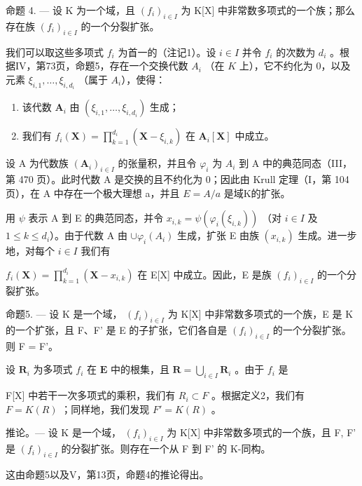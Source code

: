 命题 4. --- 设 K 为一个域，且 \((f_{i})_{i\in I}\) 为 K{[}X{]} 中非常数多项式的一个族；那么存在族 \((f_{i})_{i\in I}\) 的一个分裂扩张。

我们可以取这些多项式 \(f_{i}\) 为首一的（注记1）。设 \(i \in I\) 并令 \(f_{i}\) 的次数为 \(d_{i}\) 。根据IV，第73页，命题5，存在一个交换代数 \(A_{i}\) （在 \(K\) 上），它不约化为 0，以及元素 \(\xi_{i,1}, \ldots, \xi_{i,d_{i}}\) （属于 \(A_{i}\)），使得：

\begin{enumerate}
\def\labelenumi{\alph{enumi})}
\item
  该代数 \(\mathbf{A}_i\) 由 \((\xi_{i,1},\dots,\xi_{i,d_i})\) 生成；
\item
  我们有 \(f_{i}(\mathbf{X}) = \prod_{k=1}^{d_{i}} (\mathbf{X} - \xi_{i,k})\) 在 \(\mathbf{A}_i[\mathbf{X}]\) 中成立。
\end{enumerate}

设 A 为代数族 \((\mathbf{A}_{i})_{i\in I}\) 的张量积，并且令 \(\varphi_{i}\) 为 \(A_{i}\) 到 A 中的典范同态（III，第 470 页）。此时代数 A 是交换的且不约化为 0；因此由 Krull 定理（I，第 104 页），在 A 中存在一个极大理想 a，并且 \(E = A/a\) 是域K的扩张。

用 \(\psi\) 表示 A 到 E 的典范同态，并令 \(x_{i,k} = \psi (\varphi_i(\xi_{i,k}))\) （对 \(i\in I\) 及 \(1\leqslant k\leqslant d_i\)）。由于代数 A 由 \(\cup \varphi_i(A_i)\) 生成，扩张 E 由族 \((x_{i,k})\) 生成。进一步地，对每个 \(i\in I\) 我们有

\(f_{i}(\mathbf{X}) = \prod_{k=1}^{d_{i}} (\mathbf{X} - x_{i,k})\) 在 E{[}X{]} 中成立。因此，E 是族 \((f_{i})_{i \in I}\) 的一个分裂扩张。

命题5. --- 设 K 是一个域， \((f_i)_{i \in I}\) 为 K{[}X{]} 中非常数多项式的一个族，E 是 K 的一个扩张，且 F、F' 是 E 的子扩张，它们各自是 \((f_i)_{i \in I}\) 的一个分裂扩张。则 F = F'。

设 \(\mathbf{R}_i\) 为多项式 \(f_i\) 在 \(\mathbf{E}\) 中的根集，且 \(\mathbf{R} = \bigcup_{i\in I}\mathbf{R}_i\) 。由于 \(f_i\) 是

F{[}X{]} 中若干一次多项式的乘积，我们有 \(R_{i} \subset F\) 。根据定义2，我们有 \(F = K(R)\) ；同样地，我们发现 \(F' = K(R)\) 。

推论。--- 设 K 是一个域， \((f_{i})_{i\in I}\) 为 K{[}X{]} 中非常数多项式的一个族，且 F, F' 是 \((f_{i})_{i\in I}\) 的分裂扩张。则存在一个从 F 到 F' 的 K-同构。

这由命题5以及V，第13页，命题4的推论得出。

